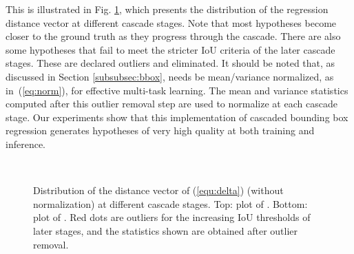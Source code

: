 \documentclass[10pt,journal,compsoc]{IEEEtran}
\begin{document}
This is illustrated in
Fig. \ref{fig:distribution}, which presents the distribution of
the regression distance vector
 at different
cascade stages. Note that most hypotheses become closer to the ground truth
as they progress through the cascade. There are also some hypotheses
that fail to meet the stricter IoU criteria of the later
cascade stages. These are declared outliers and eliminated.
It should be noted that, as discussed in Section \ref{subsubsec:bbox},
 needs be mean/variance normalized, as in~(\ref{eq:norm}), for
effective multi-task learning. The mean and variance statistics
computed after this outlier removal step are used to
normalize  at each cascade stage. Our experiments show
that this implementation of cascaded bounding box regression generates
hypotheses of very high quality at both training and inference.

\begin{figure}[!t]
\begin{minipage}[b]{.32\linewidth}
\centering
\centerline{}
\end{minipage}
\hfill
\begin{minipage}[b]{.32\linewidth}
\centering
\centerline{}
\end{minipage}
\hfill
\begin{minipage}[b]{.32\linewidth}
\centering
\centerline{}
\end{minipage}\\
\hfill
\begin{minipage}[b]{.32\linewidth}
\centering
\centerline{}
\end{minipage}
\hfill
\begin{minipage}[b]{.32\linewidth}
\centering
\centerline{}
\end{minipage}
\hfill
\begin{minipage}[b]{.32\linewidth}
\centering
\centerline{}
\end{minipage}
\caption{Distribution of the distance vector  of (\ref{equ:delta})
(without normalization) at different cascade stages. Top:
plot of . Bottom: plot of .
Red dots are outliers for the increasing IoU thresholds of
later stages, and the statistics shown are obtained after outlier removal.}
\label{fig:distribution}
\end{figure}
\end{document}
